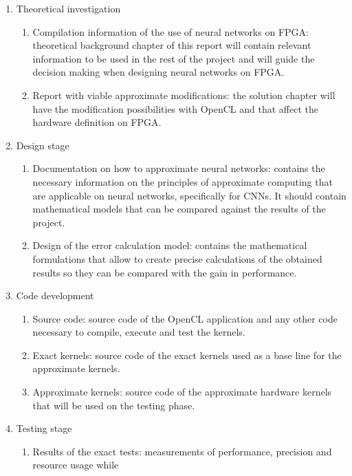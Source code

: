 \begin{enumerate}
    \item Theoretical investigation
        \begin{enumerate}
            \item Compilation information of the use of neural networks on FPGA: theoretical background
            chapter of
            this report will contain
            relevant information to be used in the rest of the project and will guide the decision
            making when designing neural networks on FPGA. 
            \item Report with viable approximate modifications: the solution chapter will have 
            the modification possibilities
            with OpenCL and that affect the hardware definition on FPGA.
        \end{enumerate}
    \item Design stage
        \begin{enumerate}
            \item Documentation on how to approximate neural networks: contains the necessary information
            on the principles of approximate computing that are applicable on neural networks, specifically
            for CNNs. It should contain mathematical models that can be compared against the results
            of the project.
            \item Design of the error calculation model: contains the mathematical formulations that allow
            to create precise calculations of the obtained results so they can be compared
            with the gain in performance.
        \end{enumerate}
    \item Code development
        \begin{enumerate}
            \item Source code: source code of the OpenCL application and any other code necessary to
            compile, execute and test the kernels.
            \item Exact kernels: source code of the exact kernels used as a base line for the approximate kernels.
            \item Approximate kernels: source code of the approximate hardware kernels that will be used
            on the testing phase.
        \end{enumerate}
    \item Testing stage
        \begin{enumerate}
            \item Results of the exact tests: measurements of performance, precision and resource usage while

\end{enumerate}
\end{enumerate}

